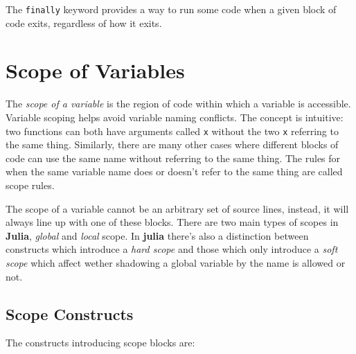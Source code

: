 \documentclass[
]{article}
\begin{document}
The \texttt{finally} keyword provides a way to run some code when a
given block of code exits, regardless of how it exits.

\newpage

\hypertarget{scope-of-variables}{%
\section{Scope of Variables}\label{scope-of-variables}}

The \emph{scope of a variable} is the region of code within which a
variable is accessible. Variable scoping helps avoid variable naming
conflicts. The concept is intuitive: two functions can both have
arguments called \texttt{x} without the two \texttt{x} referring to the
same thing. Similarly, there are many other cases where different blocks
of code can use the same name without referring to the same thing. The
rules for when the same variable name does or doesn't refer to the same
thing are called scope rules.

The scope of a variable cannot be an arbitrary set of source lines,
instead, it will always line up with one of these blocks. There are two
main types of scopes in \textbf{Julia}, \emph{global} and \emph{local}
scope. In \textbf{julia} there's also a distinction between constructs
which introduce a \emph{hard scope} and those which only introduce a
\emph{soft scope} which affect wether shadowing a global variable by the
name is allowed or not.

\hypertarget{scope-constructs}{%
\subsection{Scope Constructs}\label{scope-constructs}}

The constructs introducing scope blocks are:
\end{document}
